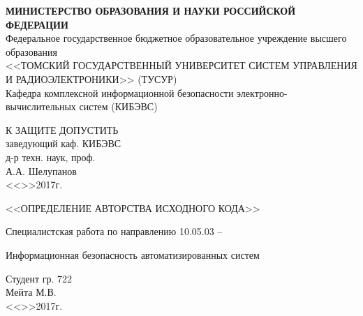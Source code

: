 \newpage
{}

\begin{center}
 \textbf{МИНИСТЕРСТВО ОБРАЗОВАНИЯ И НАУКИ РОССИЙСКОЙ ФЕДЕРАЦИИ}\\
 Федеральное государственное бюджетное образовательное учреждение высшего образования\\
 <<ТОМСКИЙ ГОСУДАРСТВЕННЫЙ УНИВЕРСИТЕТ СИСТЕМ УПРАВЛЕНИЯ И РАДИОЭЛЕКТРОНИКИ>> (ТУСУР)\\
 Кафедра комплексной информационной безопасности электронно-вычислительных систем (КИБЭВС)\\
\end{center} 

\vfill

\begin{flushright}
\begin{minipage}{0.45\textwidth}
 \begin{flushleft}
  К ЗАЩИТЕ ДОПУСТИТЬ\\
  заведующий каф. КИБЭВС\\
  д-р техн. наук, проф.\\
  \underline{\hspace{3cm}}А.А. Шелупанов \\
  <<\underline{\hspace{1cm}}>>\underline{\hspace{3cm}}2017г.\\
 \end{flushleft}
\end{minipage}
\end{flushright}

\vfill



\begin{center}
<<ОПРЕДЕЛЕНИЕ АВТОРСТВА ИСХОДНОГО КОДА>>

Специалистская работа по направлению 10.05.03 --

Информационная безопасность автоматизированных систем
\end{center}


\vfill

\begin{flushright}
\begin{minipage}{0.45\textwidth}
 \begin{flushleft}
  Студент гр. 722 \\
  \underline{\hspace{3cm}} Мейта М.В. \\
  <<\underline{\hspace{1cm}}>>\underline{\hspace{3cm}}2017г.\\
 \end{flushleft}
\end{minipage}
\end{flushright}

